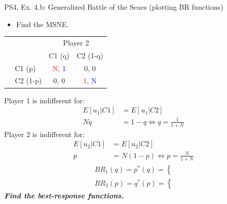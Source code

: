 \begin{frame}{PS4, Ex. 4.b: Generalized Battle of the Sexes (plotting BR functions)}
  \begin{multicols}{2}
    \begin{itemize}
      \item[(b)] Find the MSNE.
    \end{itemize}
    \vspace{-8pt}
    \begin{table}
      \begin{tabular}{cl|c|c|}
          & \multicolumn{1}{c}{} & \multicolumn{2}{c}{\color{blue}Player 2}\\
          \parbox[t]{1mm}{}
          &  &  &  \\
          & C1 (p)    & \textcolor{red}{N}, \textcolor{blue}{1} & 0, 0 \\
          & C2 (1-p)  & 0, 0 & \textcolor{red}{1}, \textcolor{blue}{N} \\
      \end{tabular}
    \end{table}
    Player 1 is indifferent for:
    \begin{align*}
      E[u_1|C1]&=E[u_1|C2]\\
      Nq &= 1-q \Leftrightarrow q = \frac{1}{1+N}
    \end{align*}
    Player 2 is indifferent for:
    \begin{align*}
      E[u_2|C1]&=E[u_2|C2]\\
      p &= N(1-p) \Leftrightarrow p = \frac{N}{1+N}
    \end{align*}
    \begin{align*}
      BR_1(q)=p^{*}(q)=\left\{\right. \\
      BR_2(p)=q^{*}(p)=\left\{\right.
    \end{align*}
  \vfill\null \columnbreak
    \textbf{\textit{Find the best-response functions.}}
  \vfill\null
  \end{multicols}
\end{frame}
